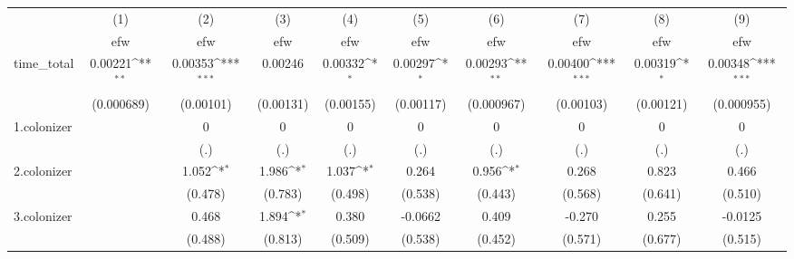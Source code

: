 {
\def\sym#1{\ifmmode^{#1}\else\(^{#1}\)\fi}
\begin{tabular}{l*{9}{c}}
\hline\hline
            &\multicolumn{1}{c}{(1)}&\multicolumn{1}{c}{(2)}&\multicolumn{1}{c}{(3)}&\multicolumn{1}{c}{(4)}&\multicolumn{1}{c}{(5)}&\multicolumn{1}{c}{(6)}&\multicolumn{1}{c}{(7)}&\multicolumn{1}{c}{(8)}&\multicolumn{1}{c}{(9)}\\
            &\multicolumn{1}{c}{efw}&\multicolumn{1}{c}{efw}&\multicolumn{1}{c}{efw}&\multicolumn{1}{c}{efw}&\multicolumn{1}{c}{efw}&\multicolumn{1}{c}{efw}&\multicolumn{1}{c}{efw}&\multicolumn{1}{c}{efw}&\multicolumn{1}{c}{efw}\\
\hline
time\_total  &     0.00221\sym{**} &     0.00353\sym{***}&     0.00246         &     0.00332\sym{*}  &     0.00297\sym{*}  &     0.00293\sym{**} &     0.00400\sym{***}&     0.00319\sym{*}  &     0.00348\sym{***}\\
            &  (0.000689)         &   (0.00101)         &   (0.00131)         &   (0.00155)         &   (0.00117)         &  (0.000967)         &   (0.00103)         &   (0.00121)         &  (0.000955)         \\
[1em]
1.colonizer &                     &           0         &           0         &           0         &           0         &           0         &           0         &           0         &           0         \\
            &                     &         (.)         &         (.)         &         (.)         &         (.)         &         (.)         &         (.)         &         (.)         &         (.)         \\
[1em]
2.colonizer &                     &       1.052\sym{*}  &       1.986\sym{*}  &       1.037\sym{*}  &       0.264         &       0.956\sym{*}  &       0.268         &       0.823         &       0.466         \\
            &                     &     (0.478)         &     (0.783)         &     (0.498)         &     (0.538)         &     (0.443)         &     (0.568)         &     (0.641)         &     (0.510)         \\
[1em]
3.colonizer &                     &       0.468         &       1.894\sym{*}  &       0.380         &     -0.0662         &       0.409         &      -0.270         &       0.255         &     -0.0125         \\
            &                     &     (0.488)         &     (0.813)         &     (0.509)         &     (0.538)         &     (0.452)         &     (0.571)         &     (0.677)         &     (0.515)         \\

\end{tabular}}
